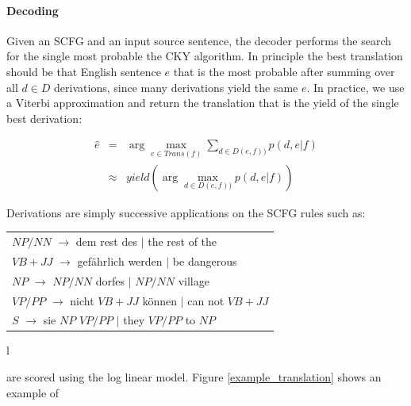 \documentclass[11pt]{article}
\begin{document}
\paragraph{Decoding}

Given an SCFG and an input source sentence, the decoder performs the search for the single most probable the CKY algorithm.  In principle the best translation should be that English sentence $e$ that is the most probable after summing over all  $d\in D$ derivations, since many derivations yield the same $e$.  In practice, we use a Viterbi approximation and return the translation that is the yield of the single best derivation:

\begin{eqnarray}
  \hat{e} &=& \arg \max_{e\in Trans(f)} \sum_{d\in D(e,f))}{p(d,e|f)}\\
             &\approx& yield(\arg \max_{d\in D(e,f))}{p(d,e|f)})
\end{eqnarray}

Derivations are simply successive applications on the SCFG rules such as:

\small
\begin{tabular}{l}
$\mathit{NP/NN}$  $\rightarrow$  dem rest des  $|$   the rest of the\\
$\mathit{VB+JJ}$  $\rightarrow$  gef\"{a}hrlich werden  $|$  be dangerous\\
$\mathit{NP}$  $\rightarrow$  $\mathit{NP/NN}$ dorfes  $|$  $\mathit{NP/NN}$ village\\
$\mathit{VP/PP}$  $\rightarrow$  nicht $\mathit{VB+JJ}$ k\"{o}nnen  $|$  can not $\mathit{VB+JJ}$\\
$\mathit{S}$  $\rightarrow$  sie $\mathit{NP}$ $\mathit{VP/PP}$  $|$  they $\mathit{VP/PP}$ to $\mathit{NP}$\\
\end{tabular}{l}
\normalsize

 are scored using the log linear model.  Figure \ref{example_translation} shows an example of 
\end{document}
